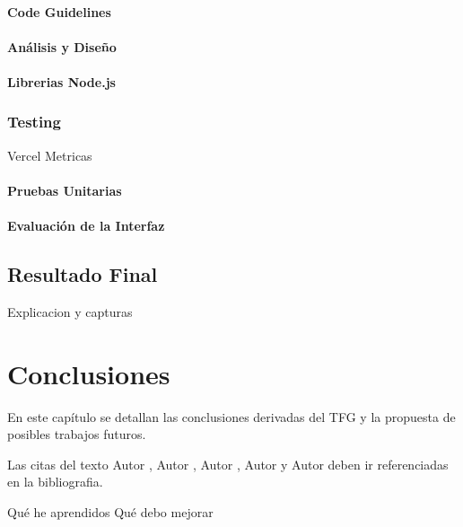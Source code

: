 \documentclass[12pt,twoside,titlepage]{report}
\newcommand\blankpage{%
    \newpage
    \null
    \thispagestyle{empty}%
    \newpage}
\begin{document}
\subsubsection{Code Guidelines}
\subsubsection{Análisis y Diseño}
\subsubsection{Librerias Node.js}

\subsection{Testing}

Vercel Metricas

\subsubsection{Pruebas Unitarias}
\subsubsection{Evaluación de la Interfaz}

\section{Resultado Final}

Explicacion y capturas

\newpage

\chapter{Conclusiones}

En este capítulo se detallan las conclusiones derivadas del TFG y la propuesta de posibles trabajos futuros.

Las citas del texto Autor \cite{giaquinta}, Autor \cite{fortune}, Autor \cite{fortuneB}, Autor \cite{mitchell} y Autor \cite{morrey} deben ir referenciadas en la bibliografia.


Qué he aprendidos
Qué debo mejorar

\blankpage



\end{document}
